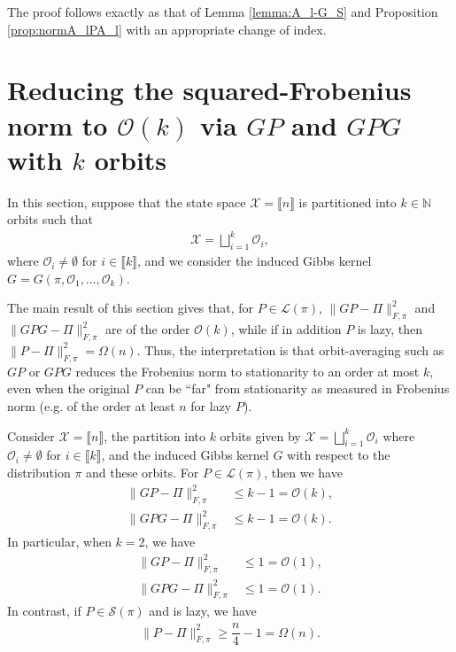 \documentclass[EJP]{ejpecp} %
\begin{document}
The proof follows exactly as that of Lemma \ref{lemma:A_l-G_S} and Proposition \ref{prop:normA_lPA_l} with an appropriate change of index.

\section{Reducing the squared-Frobenius norm to $\mathcal{O}(k)$ via $GP$ and $GPG$ with $k$ orbits} \label{sec:frobeg}

In this section, suppose that the state space $\mathcal{X} = \llbracket n \rrbracket$ is partitioned into $k \in \mathbb{N}$ orbits such that
\begin{align*}
    \mathcal{X} = \bigsqcup_{i=1}^k \mathcal{O}_i,
\end{align*}
where $\mathcal{O}_i \neq \emptyset$ for $i \in \llbracket k \rrbracket$, and we consider the induced Gibbs kernel $G = G(\pi,\mathcal{O}_1,\ldots,\mathcal{O}_k)$.

The main result of this section gives that, for $P \in \mathcal{L}(\pi)$, $\|GP - \Pi \|_{F,\pi}^2$ and $\|GPG - \Pi \|_{F,\pi}^2$ are of the order $\mathcal{O}(k)$, while if in addition $P$ is lazy, then $\|P - \Pi\|_{F,\pi}^2 = \Omega(n)$. Thus, the interpretation is that orbit-averaging such as $GP$ or $GPG$ reduces the Frobenius norm to stationarity to an order at most $k$, even when the original $P$ can be ``far" from stationarity as measured in Frobenius norm (e.g. of the order at least $n$ for lazy $P$).

\begin{proposition}\label{prop:Froborder}
    Consider $\mathcal{X} = \llbracket n \rrbracket$, the partition into $k$ orbits given by $\mathcal{X} = \bigsqcup_{i=1}^k \mathcal{O}_i$ where $\mathcal{O}_i \neq \emptyset$ for $i \in \llbracket k \rrbracket$,   and the induced Gibbs kernel $G$ with respect to the distribution $\pi$ and these orbits. 
    For $P \in \mathcal{L}(\pi)$, then we have
    \begin{align*}
        \|GP - \Pi \|_{F,\pi}^2 &\leq k - 1 = \mathcal{O}(k), \\
        \|GPG - \Pi \|_{F,\pi}^2 &\leq k - 1 = \mathcal{O}(k).
    \end{align*}
    In particular, when $k = 2$, we have
    \begin{align*}
        \|GP - \Pi \|_{F,\pi}^2 &\leq 1 = \mathcal{O}(1), \\
        \|GPG - \Pi \|_{F,\pi}^2 &\leq 1 = \mathcal{O}(1).
    \end{align*}
    In contrast, if $P \in \mathcal{S}(\pi)$ and is lazy, we have
    \begin{align*}
        \|P - \Pi\|_{F,\pi}^2 \geq \dfrac{n}{4} - 1 = \Omega(n).
    \end{align*}
\end{proposition}
\end{document}
